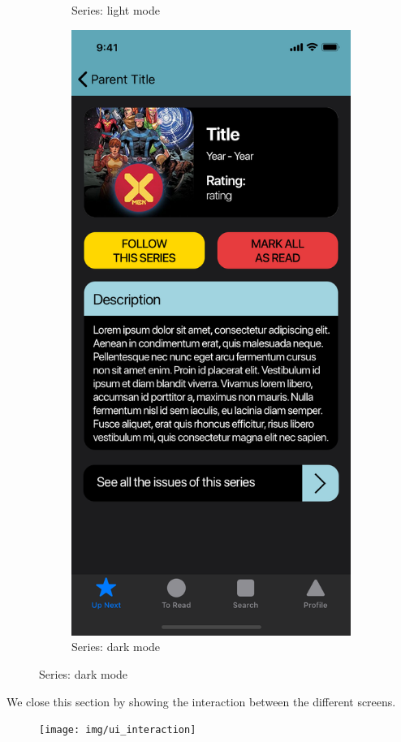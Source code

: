 \begin{figure}[p]
\begin{subfigure}[b]{0.4\textwidth}
    \caption{Series: light mode}
    \label{fig:1}
  \end{subfigure}
  \hfill
  \begin{subfigure}[b]{0.4\textwidth}
    \includegraphics[width=\textwidth]{img/mockups/dark_mode}
    \caption{Series: dark mode}
    \label{fig:2}
  \end{subfigure}
\end{figure}

\clearpage

We close this section by showing the interaction between the different screens.
\vspace{8mm}

\begin{figure}[h]
\centering
\texttt{[image: img/ui\_interaction]}
\end{figure}

